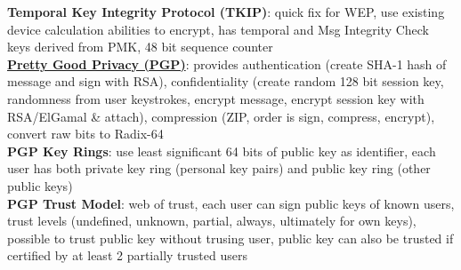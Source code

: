 \documentclass[a4paper]{article}
\begin{document}
\begin{multicols}{2}
        \textbf{Temporal Key Integrity Protocol (TKIP)}: quick fix for WEP, use existing device calculation abilities to encrypt, has temporal and Msg Integrity Check keys derived from PMK, 48 bit sequence counter\\
        \underline{\textbf{Pretty Good Privacy (PGP)}}: provides authentication (create SHA-1 hash of message and sign with RSA), confidentiality (create random 128 bit session key, randomness from user keystrokes, encrypt message, encrypt session key with RSA/ElGamal \& attach), compression (ZIP, order is sign, compress, encrypt), convert raw bits to Radix-64\\
        \textbf{PGP Key Rings}: use least significant 64 bits of public key as identifier, each user has both private key ring (personal key pairs) and public key ring (other public keys)\\
        \textbf{PGP Trust Model}: web of trust, each user can sign public keys of known users, trust levels (undefined, unknown, partial, always, ultimately for own keys), possible to trust public key without trusing user, public key can also be trusted if certified by at least 2 partially trusted users
    \end{multicols}
    
\end{document}
